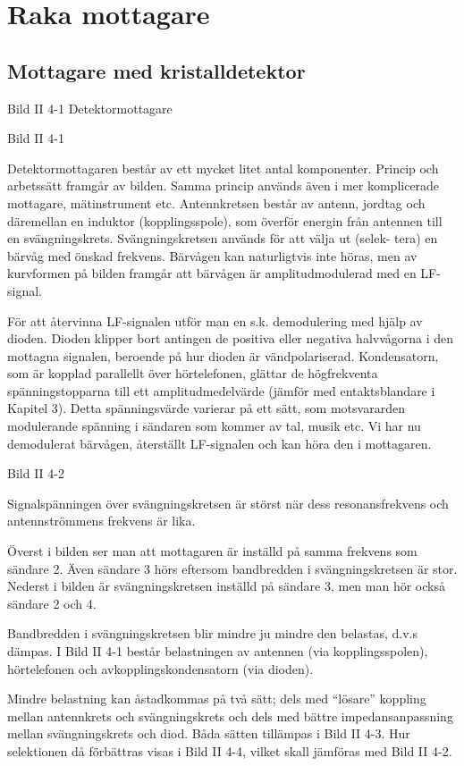 \section{Raka mottagare}

\subsection{Mottagare med kristalldetektor}

Bild II 4-1 Detektormottagare

Bild II 4-1

Detektormottagaren består av ett mycket litet antal
komponenter. Princip och arbetssätt framgår av bilden. Samma princip
används även i mer komplicerade mottagare, mätinstrument
etc. Antennkretsen består av antenn, jordtag och däremellan en
induktor (kopplingsspole), som överför energin från antennen till en
svängningskrets. Svängningskretsen används för att välja ut (selek-
tera) en bärvåg med önskad frekvens. Bärvågen kan naturligtvis inte
höras, men av kurvformen på bilden framgår att bärvågen är
amplitudmodulerad med en LF-signal.

För att återvinna LF-signalen utför man en s.k. demodulering med hjälp
av dioden.  Dioden klipper bort antingen de positiva eller negativa
halvvågorna i den mottagna signalen, beroende på hur dioden är
vändpolariserad. Kondensatorn, som är kopplad parallellt över
hörtelefonen, glättar de högfrekventa spänningstopparna till ett
amplitudmedelvärde (jämför med entaktsblandare i Kapitel 3). Detta
spänningsvärde varierar på ett sätt, som motsvararden modulerande
spänning i sändaren som kommer av tal, musik etc. Vi har nu
demodulerat bärvågen, återställt LF-signalen och kan höra den i
mottagaren.

Bild II 4-2

Signalspänningen över svängningskretsen är störst när dess
resonansfrekvens och antennströmmens frekvens är lika.

Överst i bilden ser man att mottagaren är inställd på samma frekvens
som sändare 2.  Även sändare 3 hörs eftersom bandbredden i
svängningskretsen är stor. Nederst i bilden är svängningskretsen
inställd på sändare 3, men man hör också sändare 2 och 4.

Bandbredden i svängningskretsen blir mindre ju mindre den belastas,
d.v.s dämpas. I Bild II 4-1 består belastningen av antennen (via
kopplingsspolen), hörtelefonen och avkopplingskondensatorn (via
dioden).

Mindre belastning kan åstadkommas på två sätt; dels med ``lösare''
koppling mellan antennkrets och svängningskrets och dels med bättre
impedansanpassning mellan svängningskrets och diod. Båda sätten
tillämpas i Bild II 4-3. Hur selektionen då förbättras visas i Bild II
4-4, vilket skall jämföras med Bild II 4-2.

